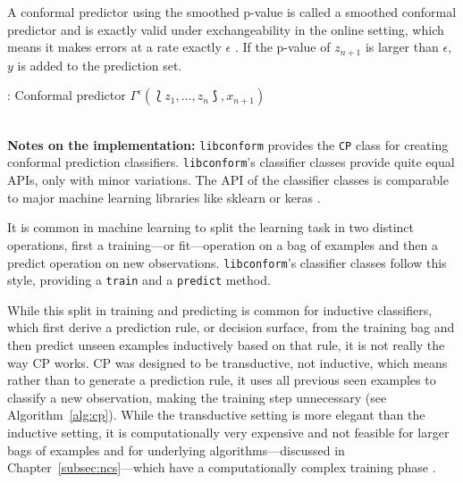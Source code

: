 \documentclass[twoside,11pt]{article}
\def\libconform{\texttt{libconform}}
\begin{document}
A conformal predictor using the smoothed p-value is called
a smoothed conformal predictor and is exactly valid under
exchangeability in the online setting, which means it makes
errors at a rate exactly $\epsilon$
\citep[see][Chapter 2]{alrw}.
If the p-value of $z_{n+1}$ is larger than $\epsilon$, $y$
is added to the prediction set.

\begin{algorithm}
  \caption{: Conformal predictor $\Gamma^\epsilon
    (\Lbag z_1,\dots,z_n \Rbag, x_{n+1})$}
  \label{alg:cp}

  \begin{algorithmic}[1]
      \ENDFOR
      \ENDIF
    \ENDFOR
  \end{algorithmic}
\end{algorithm}
\textcolor{white}{bad workaround}\\

\noindent
\textbf{Notes on the implementation:}
\libconform{} provides the \texttt{CP} class for creating
conformal prediction classifiers. \libconform{}'s
classifier classes provide quite equal APIs, only with
minor variations.
The API of the classifier classes is comparable to major
machine learning libraries like sklearn or keras
\citep[see][]{sklearn_api, keras}.

It is common in machine learning to split the learning task
in two distinct operations, first a
training---or fit---operation on a bag of examples
and then a predict operation on new observations.
\libconform{}'s classifier classes follow this style,
providing a \texttt{train} and a \texttt{predict} method.

While this split in training and predicting is common for
inductive classifiers, which first derive a prediction
rule, or decision surface, from the training bag and then
predict unseen examples inductively based on that rule,
it is not really the way CP works. CP was designed to be
transductive, not inductive, which means rather than
to generate a prediction rule, it uses all previous seen
examples to classify a new observation, making the training
step unnecessary (see Algorithm~\ref{alg:cp}).
While the transductive setting is more elegant than the
inductive setting, it is computationally very expensive and
not feasible for larger bags of examples and for underlying
algorithms---discussed in Chapter~\ref{subsec:ncs}---which
have a computationally complex training phase
\citep[see][Chapter 1]{papadopoulos_et_al_2007,alrw}.
\end{document}
